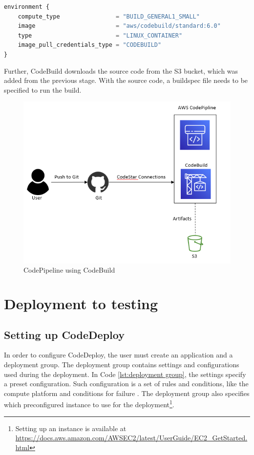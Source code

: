 \vspace{2mm}
\begin{lstlisting}[language=terraform, caption=Creation of a build environment, captionpos=b, frame=single, label=lst:CodeBuildEnvironment]
environment {
    compute_type                = "BUILD_GENERAL1_SMALL"
    image                       = "aws/codebuild/standard:6.0"
    type                        = "LINUX_CONTAINER"
    image_pull_credentials_type = "CODEBUILD"
}
\end{lstlisting}

Further, CodeBuild downloads the source code from the S3 bucket, which was added from the previous stage. With the source code, a \gls{buildspec} file needs to be specified to run the build.

\vspace{2mm}
\begin{figure}[H]
    \centering
    \includegraphics[width=0.6\columnwidth]{Images/aws-piplin-3.png}
    \caption{CodePipeline using CodeBuild}
    \label{fig: CodePipeline using CodeBuild}
\end{figure}
\newpage
\section{Deployment to testing}
\label{Deployment to testing}
\subsection{Setting up CodeDeploy}
In order to configure CodeDeploy, the user must create an application and a deployment group. The deployment group contains settings and configurations used during the deployment. In Code \ref{lst:deployment group}, the settings specify a preset configuration. Such configuration is a set of rules and conditions, like the \gls{compute platform} and conditions for failure \cite{CodeDeployConfig}. The deployment group also specifies which preconfigured instance to use for the deployment\footnote{Setting up an instance is available at \url{https://docs.aws.amazon.com/AWSEC2/latest/UserGuide/EC2_GetStarted.html}}. 

